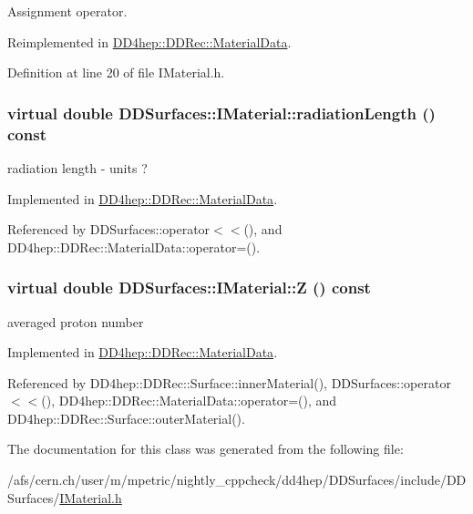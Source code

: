 Assignment operator. 

Reimplemented in \hyperlink{class_d_d4hep_1_1_d_d_rec_1_1_material_data_af4fcb3ac628a39c87c895bcb478ac30d}{DD4hep::DDRec::MaterialData}.

Definition at line 20 of file IMaterial.h.\hypertarget{class_d_d_surfaces_1_1_i_material_a30bf2290a5f4616d6f0ad5bd2e500300}{
\subsubsection[{radiationLength}]{\setlength{\rightskip}{0pt plus 5cm}virtual double DDSurfaces::IMaterial::radiationLength () const}}
\label{class_d_d_surfaces_1_1_i_material_a30bf2290a5f4616d6f0ad5bd2e500300}


radiation length -\/ units ? 

Implemented in \hyperlink{class_d_d4hep_1_1_d_d_rec_1_1_material_data_a75a9b15822c405e501758aa134806353}{DD4hep::DDRec::MaterialData}.

Referenced by DDSurfaces::operator$<$$<$(), and DD4hep::DDRec::MaterialData::operator=().\hypertarget{class_d_d_surfaces_1_1_i_material_a3e5d3e85db97ff9edb25a073109a14b0}{
\subsubsection[{Z}]{\setlength{\rightskip}{0pt plus 5cm}virtual double DDSurfaces::IMaterial::Z () const}}
\label{class_d_d_surfaces_1_1_i_material_a3e5d3e85db97ff9edb25a073109a14b0}


averaged proton number 

Implemented in \hyperlink{class_d_d4hep_1_1_d_d_rec_1_1_material_data_a88319ef5ac7fe45c92bcd76bcd863abc}{DD4hep::DDRec::MaterialData}.

Referenced by DD4hep::DDRec::Surface::innerMaterial(), DDSurfaces::operator$<$$<$(), DD4hep::DDRec::MaterialData::operator=(), and DD4hep::DDRec::Surface::outerMaterial().

The documentation for this class was generated from the following file:\begin{DoxyCompactItemize}
\item 
/afs/cern.ch/user/m/mpetric/nightly\_\-cppcheck/dd4hep/DDSurfaces/include/DDSurfaces/\hyperlink{_i_material_8h}{IMaterial.h}\end{DoxyCompactItemize}

